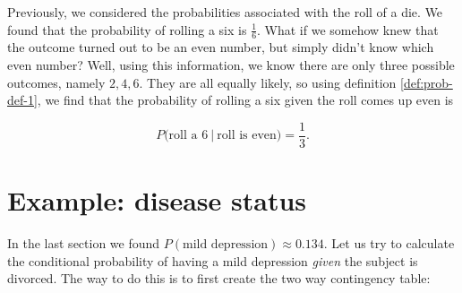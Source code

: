 \documentclass[]{book}
\theoremstyle{definition}
\theoremstyle{definition}
\theoremstyle{definition}
\theoremstyle{remark}
\begin{document}
Previously, we considered the probabilities associated with the roll of a die. We found that the probability of rolling a six is \(\frac{1}{6}\). What if we somehow knew that the outcome turned out to be an even number, but simply didn't know which even number? Well, using this information, we know there are only three possible outcomes, namely \(2,4,6\). They are all equally likely, so using definition \ref{def:prob-def-1}, we find that the probability of rolling a six given the roll comes up even is

\[\left .P(\text{roll a } 6\ \right|\ \text{roll is even}) = \frac{1}{3}.\]

\hypertarget{example-disease-status-2}{%
\section{Example: disease status}\label{example-disease-status-2}}

In the last section we found \(P(\text{mild depression}) \approx 0.134\). Let us try to calculate the conditional probability of having a mild depression \emph{given} the subject is divorced. The way to do this is to first create the two way contingency table:
\end{document}
